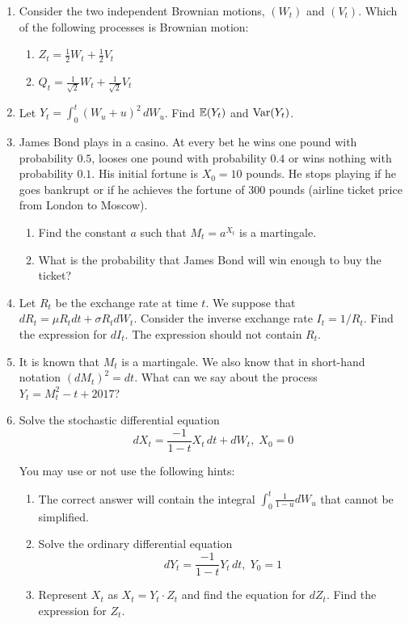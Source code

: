\documentclass[12pt, a4paper]{article}
\begin{document}
\begin{enumerate}

\item Consider the two independent Brownian motions, $(W_t)$ and $(V_t)$. Which of the following processes is Brownian motion:
\begin{enumerate}
\item $Z_t = \frac{1}{2}W_t + \frac{1}{2}V_t$
\item $Q_t = \frac{1}{\sqrt{2}}W_t + \frac{1}{\sqrt{2}}V_t$
\end{enumerate}

\item Let $Y_t = \int_0^t (W_u + u)^2 \, dW_u$. Find $\mathbb{E}(Y_t)$ and $\operatorname{Var}(Y_t)$.

\item James Bond plays in a casino. At every bet he wins one pound with probability $0.5$, looses one pound with probability $0.4$ or wins nothing with probability $0.1$. His initial fortune is $X_0 = 10$ pounds. He stops playing if he goes bankrupt or if he achieves the fortune of $300$ pounds (airline ticket price from London to Moscow).
\begin{enumerate}
\item Find the constant $a$ such that $M_t = a^{X_t}$ is a martingale.
\item What is the probability that James Bond will win enough to buy the ticket?
\end{enumerate}


\item Let $R_t$ be the exchange rate at time $t$. We suppose that $dR_t = \mu R_t dt + \sigma R_t dW_t$. Consider the inverse exchange rate $I_t = 1/R_t$. Find the expression for $dI_t$. The expression should not contain $R_t$.

\item It is known that $M_t$ is a martingale. We also know that in short-hand notation $(dM_t)^2 = dt$. What can we say about the process $Y_t = M_t^2 - t + 2017$?

\item Solve the stochastic differential equation
\begin{equation}
dX_t = \frac{-1}{1 - t}X_t \, dt + dW_t, \; X_0 = 0
\end{equation}

You may use or not use the following hints:

\begin{enumerate}
\item The correct answer will contain the integral $\int_0^t \frac{1}{1 - u} dW_u$ that cannot be simplified.
\item Solve the ordinary differential equation
\begin{equation}
dY_t = \frac{-1}{1 - t}Y_t \, dt, \; Y_0 = 1
\end{equation}
\item Represent $X_t$ as $X_t = Y_t \cdot Z_t$ and find the equation for $dZ_t$. Find the expression for $Z_t$.
\end{enumerate}


\end{enumerate}
\end{document}
